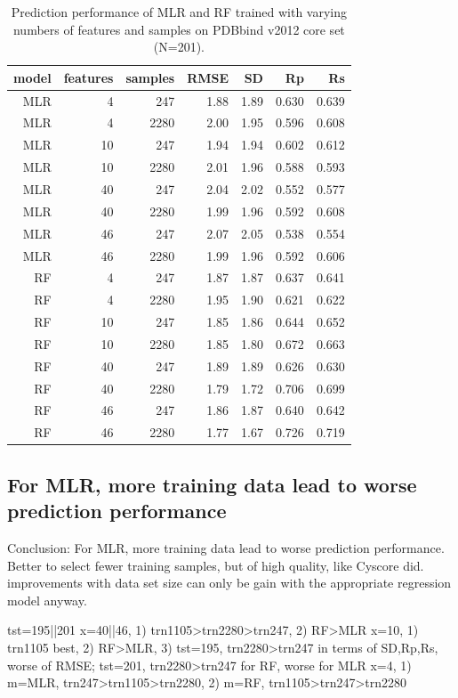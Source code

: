 \documentclass[10pt,conference,compsocconf]{IEEEtran}
\begin{document}
\begin{table}
\centering
\begin{tabular*}{\linewidth}{@{\extracolsep{\fill}}rrrrrrr}
\toprule
model & features & samples & RMSE & SD & Rp & Rs\\
\midrule
MLR &  4 &  247 & 1.88 & 1.89 & 0.630 & 0.639\\
MLR &  4 & 2280 & 2.00 & 1.95 & 0.596 & 0.608\\
MLR & 10 &  247 & 1.94 & 1.94 & 0.602 & 0.612\\
MLR & 10 & 2280 & 2.01 & 1.96 & 0.588 & 0.593\\
MLR & 40 &  247 & 2.04 & 2.02 & 0.552 & 0.577\\
MLR & 40 & 2280 & 1.99 & 1.96 & 0.592 & 0.608\\
MLR & 46 &  247 & 2.07 & 2.05 & 0.538 & 0.554\\
MLR & 46 & 2280 & 1.99 & 1.96 & 0.592 & 0.606\\
 RF &  4 &  247 & 1.87 & 1.87 & 0.637 & 0.641\\
 RF &  4 & 2280 & 1.95 & 1.90 & 0.621 & 0.622\\
 RF & 10 &  247 & 1.85 & 1.86 & 0.644 & 0.652\\
 RF & 10 & 2280 & 1.85 & 1.80 & 0.672 & 0.663\\
 RF & 40 &  247 & 1.89 & 1.89 & 0.626 & 0.630\\
 RF & 40 & 2280 & 1.79 & 1.72 & 0.706 & 0.699\\
 RF & 46 &  247 & 1.86 & 1.87 & 0.640 & 0.642\\
 RF & 46 & 2280 & 1.77 & 1.67 & 0.726 & 0.719\\
\bottomrule
\end{tabular*}
\caption{Prediction performance of MLR and RF trained with varying numbers of features and samples on PDBbind v2012 core set (N=201).}
\label{tbl:tst201}
\end{table}

\subsection{For MLR, more training data lead to worse prediction performance}

Conclusion: For MLR, more training data lead to worse prediction performance. Better to select fewer training samples, but of high quality, like Cyscore did.
improvements with data set size can only be gain with the appropriate regression model anyway.

tst=195||201
x=40||46, 1) trn1105>trn2280>trn247, 2) RF>MLR
x=10, 1) trn1105 best, 2) RF>MLR, 3) tst=195, trn2280>trn247 in terms of SD,Rp,Rs, worse of RMSE; tst=201, trn2280>trn247 for RF, worse for MLR
x=4, 1) m=MLR, trn247>trn1105>trn2280, 2) m=RF, trn1105>trn247>trn2280
\end{document}
